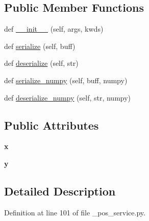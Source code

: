 \subsection*{Public Member Functions}
\begin{DoxyCompactItemize}
\item 
def \hyperlink{classass1_1_1srv_1_1__pos__service_1_1pos__serviceResponse_abaa31fbb2940ea320a46f5f31722656f}{\+\_\+\+\_\+init\+\_\+\+\_\+} (self, args, kwds)
\item 
def \hyperlink{classass1_1_1srv_1_1__pos__service_1_1pos__serviceResponse_ae5a097dc426d7a9b31e126eda37f356d}{serialize} (self, buff)
\item 
def \hyperlink{classass1_1_1srv_1_1__pos__service_1_1pos__serviceResponse_a904cf81143a58e5fc8a67b87c066354e}{deserialize} (self, str)
\item 
def \hyperlink{classass1_1_1srv_1_1__pos__service_1_1pos__serviceResponse_a57c1d192253de8665c2b877f50dba38c}{serialize\+\_\+numpy} (self, buff, numpy)
\item 
def \hyperlink{classass1_1_1srv_1_1__pos__service_1_1pos__serviceResponse_a9d8f507e3c4d230cba34e3b92bcedfcf}{deserialize\+\_\+numpy} (self, str, numpy)
\end{DoxyCompactItemize}
\subsection*{Public Attributes}
\begin{DoxyCompactItemize}
\item 
\mbox{\label{classass1_1_1srv_1_1__pos__service_1_1pos__serviceResponse_a0a35141495e2ebf094f2694c215c5411}} 
{\bfseries x}
\item 
\mbox{\label{classass1_1_1srv_1_1__pos__service_1_1pos__serviceResponse_a8b751a313237f5e40365fe8e49d3344a}} 
{\bfseries y}
\end{DoxyCompactItemize}


\subsection{Detailed Description}


Definition at line 101 of file \+\_\+pos\+\_\+service.\+py.




